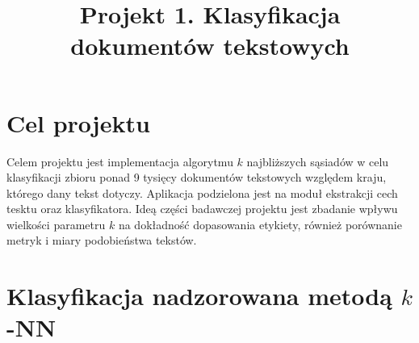 \documentclass{classrep}
\author{
  \studentinfo{Daria Rogowska}{229989} \and
  \studentinfo{Mateusz Srebnik}{230004} }
\title{Projekt 1. Klasyfikacja dokumentów tekstowych}
\begin{document}
\maketitle


\section{Cel projektu}
Celem projektu jest implementacja algorytmu $k$ najbliższych sąsiadów w celu klasyfikacji
zbioru ponad 9 tysięcy dokumentów tekstowych \cite{teksty} względem kraju, którego dany tekst dotyczy. Aplikacja podzielona jest na moduł ekstrakcji 
cech tesktu oraz klasyfikatora. 
Ideą części badawczej projektu jest zbadanie wpływu wielkości parametru $k$
na dokładność dopasowania etykiety, również porównanie metryk i miary podobieństwa tekstów.





\section{Klasyfikacja nadzorowana metodą $k$-NN}
\end{document}
